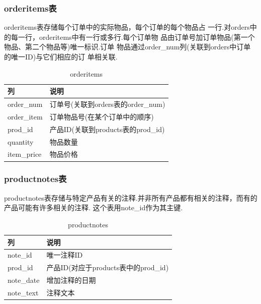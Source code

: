 \subsubsection{orderitems表}
orderitems表存储每个订单中的实际物品，每个订单的每个物品占
一行.对orders中的每一行，orderitems中有一行或多行.每个订单物
品由订单号加订单物品(第一个物品、第二个物品等)唯一标识.订单
物品通过order\_num列(关联到orders中订单的唯一ID)与它们相应的订
单相关联.

\begin{table}[H]
  \caption{orderitems}
  \begin{center}
    \begin{tabular}[c]{|l|l|}
      \hline
      列 & 说明 \\
      \hline
      order\_num & 订单号(关联到orders表的order\_num) \\
      \hline
      order\_item & 订单物品号(在某个订单中的顺序) \\
      \hline
      prod\_id & 产品ID(关联到products表的prod\_id) \\
      \hline
      quantity & 物品数量 \\
      \hline
      item\_price & 物品价格 \\
      \hline
    \end{tabular}
  \end{center}
\end{table}

\subsubsection{productnotes表}
productnotes表存储与特定产品有关的注释.并非所有产品都有相关的注释，而有的产品可能有许多相关的注释.
这个表用note\_id作为其主键.

\begin{table}[H]
  \caption{productnotes}
  \begin{center}
    \begin{tabular}[c]{|l|l|}
      \hline
      列 & 说明 \\
      \hline
      note\_id & 唯一注释ID \\
      \hline
      prod\_id & 产品ID(对应于products表中的prod\_id) \\
      \hline
      note\_date & 增加注释的日期 \\
      \hline
      note\_text & 注释文本 \\
      \hline
    \end{tabular}
  \end{center}
\end{table}

